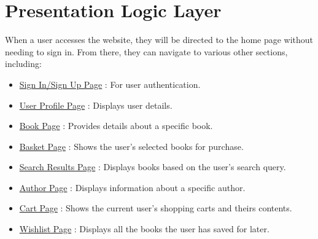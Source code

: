 \section{Presentation Logic Layer}
When a user accesses the website, they will be directed to the home page without needing to sign in. From there, they can navigate to various other sections, including:
\begin{itemize}
    \item \hyperref[sec:signin]{Sign In/Sign Up Page} : For user authentication.
    \item \hyperref[sec:profile]{User Profile Page} : Displays user details.
    \item \hyperref[sec:book]{Book Page} : Provides details about a specific book.
    \item \hyperref[sec:basket]{Basket Page} : Shows the user's selected books for purchase.
    \item \hyperref[sec:search]{Search Results Page} : Displays books based on the user’s search query.
    \item \hyperref[sec:author]{Author Page} : Displays information about a specific author.
    \item \hyperref[sec:cart]{Cart Page} : Shows the current user's shopping carts and theirs contents.
    \item \hyperref[sec:wishlist]{Wishlist Page} : Displays all the books the user has saved for later.

\end{itemize}

